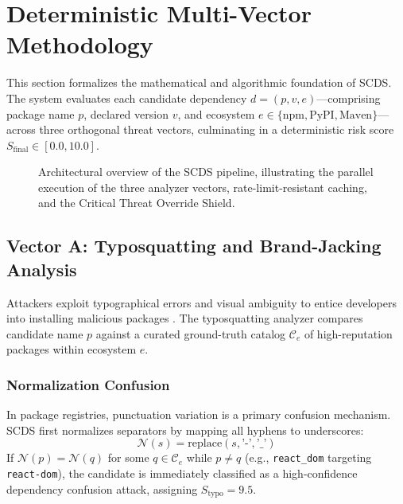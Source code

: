 \section{Deterministic Multi-Vector Methodology}
\label{sec:method}

This section formalizes the mathematical and algorithmic foundation of SCDS. The system evaluates each candidate dependency $d = (p, v, e)$---comprising package name $p$, declared version $v$, and ecosystem $e \in \{\text{npm}, \text{PyPI}, \text{Maven}\}$---across three orthogonal threat vectors, culminating in a deterministic risk score $S_{\text{final}} \in [0.0, 10.0]$.

\begin{figure}[t]
\centering
\resizebox{0.95\textwidth}{!}{}
\caption{Architectural overview of the SCDS pipeline, illustrating the parallel execution of the three analyzer vectors, rate-limit-resistant caching, and the Critical Threat Override Shield.}
\label{fig:arch}
\end{figure}

\subsection{Vector A: Typosquatting and Brand-Jacking Analysis}
\label{sec:method_typo}
Attackers exploit typographical errors and visual ambiguity to entice developers into installing malicious packages \cite{davis2025typosmart}. The typosquatting analyzer compares candidate name $p$ against a curated ground-truth catalog $\mathcal{C}_e$ of high-reputation packages within ecosystem $e$.

\subsubsection{Normalization Confusion}
In package registries, punctuation variation is a primary confusion mechanism. SCDS first normalizes separators by mapping all hyphens to underscores:
\begin{equation}
\mathcal{N}(s) = \text{replace}(s, \text{'-'}, \text{'\_'})
\end{equation}
If $\mathcal{N}(p) = \mathcal{N}(q)$ for some $q \in \mathcal{C}_e$ while $p \neq q$ (e.g., \texttt{react\_dom} targeting \texttt{react-dom}), the candidate is immediately classified as a high-confidence dependency confusion attack, assigning $S_{\text{typo}} = 9.5$.

